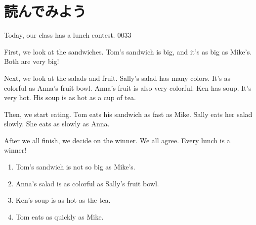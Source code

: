 \documentclass[aspectratio=169,xcolor={dvipsnames,table}]{beamer}
\begin{document}
\section{読んでみよう}
\begin{frame}[plain,t]

\small
\begin{tcolorbox}\parindent=15pt
\noindent{}Today, our class has a lunch contest.%
\hfill{\tiny 0033}\,{\scriptsize {}}

    First, we look at the sandwiches. Tom's sandwich is big, and it's as big as Mike's. Both are very big!

    Next, we look at the salads and fruit. Sally's salad has many colors. It's as colorful as Anna's fruit bowl. Anna's fruit is also very colorful. Ken has soup. It's very hot. His soup is as hot as a cup of tea.

    Then, we start eating. Tom eats his sandwich as fast as Mike.  Sally eats her salad slowly. She eats as slowly as Anna.

    After we all finish, we decide on the winner. We all agree. Every lunch is a winner!%
\end{tcolorbox}


\begin{enumerate}\small\setlength{\itemsep}{01pt}
 \item<2-> Tom's sandwich is not so big as Mike's.\hfill{}
 \item<2-> Anna's salad is as colorful as Sally's fruit bowl.\hfill{}
 \item<2-> Ken's soup is as hot as the tea.\hfill{}
 \item<2-> Tom eats as quickly as Mike.\hfill{}
\end{enumerate}



\end{frame}
\end{document}
